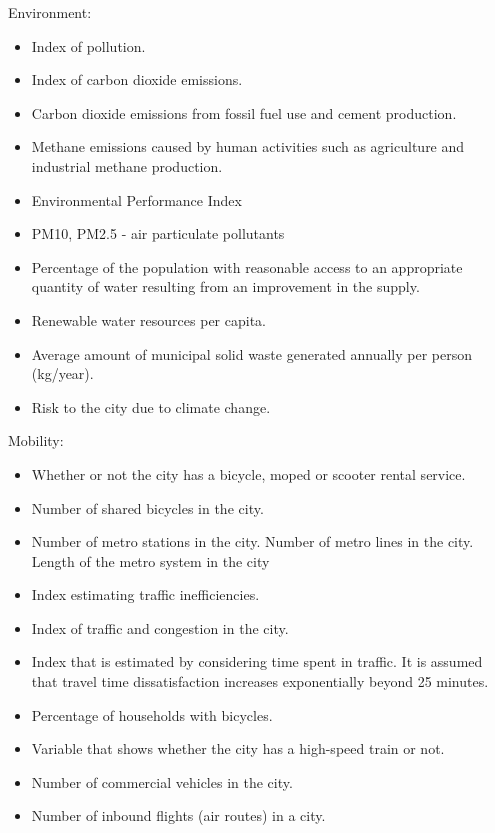 \documentclass[
  english,
  12pt,
  a4paper,
]{scrartcl}
\providecommand{\tightlist}{%
  \setlength{\itemsep}{0pt}\setlength{\parskip}{0pt}}
\begin{document}
Environment:

\begin{itemize}
\tightlist
\item
  Index of pollution.
\item
  Index of carbon dioxide emissions.
\item
  Carbon dioxide emissions from fossil fuel use and cement production.
\item
  Methane emissions caused by human activities such as agriculture and
  industrial methane production.
\item
  Environmental Performance Index
\item
  PM10, PM2.5 - air particulate pollutants
\item
  Percentage of the population with reasonable access to an appropriate
  quantity of water resulting from an improvement in the supply.
\item
  Renewable water resources per capita.
\item
  Average amount of municipal solid waste generated annually per person
  (kg/year).
\item
  Risk to the city due to climate change.
\end{itemize}

Mobility:

\begin{itemize}
\tightlist
\item
  Whether or not the city has a bicycle, moped or scooter rental
  service.
\item
  Number of shared bicycles in the city.
\item
  Number of metro stations in the city. Number of metro lines in the
  city. Length of the metro system in the city
\item
  Index estimating traffic inefficiencies.
\item
  Index of traffic and congestion in the city.
\item
  Index that is estimated by considering time spent in traffic. It is
  assumed that travel time dissatisfaction increases exponentially
  beyond 25 minutes.
\item
  Percentage of households with bicycles.
\item
  Variable that shows whether the city has a high-speed train or not.
\item
  Number of commercial vehicles in the city.
\item
  Number of inbound flights (air routes) in a city.
\end{itemize}
\end{document}
